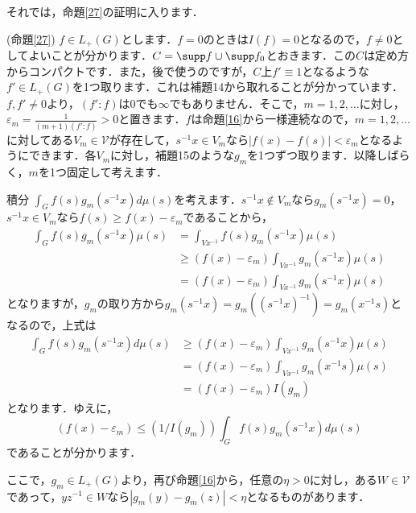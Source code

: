 それでは，命題\ref{27}の証明に入ります．
\begin{Proof}(命題\ref{27})
$f \in L_{+}(G)$とします．$f=0$のときは$I(f)=0$となるので，$f \neq 0$としてよいことが分かります．$C=\supp f \cup \supp f_{0}$とおきます．この$C$は定め方からコンパクトです．また，後で使うのですが，$C$上$f' \equiv 1$となるような$f' \in L_{
+}(G)$を1つ取ります．これは補題14から取れることが分かっています．$f, f' \neq 0$より，$\left( f' \colon f\right)$は0でも$\infty$でもありません．そこで，$m=1,2,\ldots$に対し，$\varepsilon_{m}=\frac{1}{(m+1)\left( f' \colon f \right)}>0$と置きます．$f$は命題\ref{16}から一様連続なので，$m=1,2,\ldots$に対してある$V_m \in \mathscr{V}$が存在して，$s^{-1}x \in V_m$なら$|f(x)-f(s)|<\varepsilon _{m}$となるようにできます．各$V_m$に対し，補題15のような$g_m$を1つずつ取ります．以降しばらく，$m$を1つ固定して考えます．

積分 $\int_{G}f(s)g_{m}(s^{-1}x)d\mu(s)$を考えます．$s^{-1}x \not\in V_m$なら$g_{m}(s^{-1}x)=0$，$s^{-1}x \in V_m$なら$f(s) \ge f(x) -\varepsilon_{m}$であることから，
\begin{align*}
\int_{G}f(s)g_{m}(s^{-1}x)\mu(s) & =\int_{Vx^{-1}}f(s)g_{m}(s^{-1}x)\mu(s) \\
 & \ge (f(x)-\varepsilon_{m})\int_{Vx^{-1}}g_{m}(s^{-1}x)\mu(s) \\
 & =(f(x)-\varepsilon_{m})\int_{Vx^{-1}}g_{m}(s^{-1}x)\mu(s)
\end{align*}
となりますが，$g_{m}$の取り方から$g_{m}(s^{-1}x)=g_{m}\left( (s^{-1}x)^{-1} \right)=g_{m}(x^{-1}s)$となるので，上式は
\begin{align*}
\int_{G}f(s)g_{m}(s^{-1}x)d\mu(s) & \ge (f(x)-\varepsilon_{m})\int_{Vx^{-1}}g_{m}(s^{-1}x)\mu(s) \\
 & = (f(x)-\varepsilon_{m})\int_{Vx^{-1}}g_{m}(x^{-1}s)\mu(s) \\
 & =(f(x)-\varepsilon_{m}) I(g_{m})
\end{align*}
となります．ゆえに，
\begin{equation}
(f(x)-\varepsilon_{m}) \le \left( 1/I(g_{m}) \right)\int_{G}f(s)g_{m}(s^{-1}x)d\mu(s)
\label{i2}
\end{equation}
であることが分かります．

ここで，$g_{m} \in L_{+}(G)$より，再び命題\ref{16}から，任意の$\eta >0$に対し，ある$W \in \mathscr{V}$であって，$yz^{-1} \in W$なら$|g_{m}(y)-g_{m}(z)|<\eta$となるものがあります．


\end{Proof}
